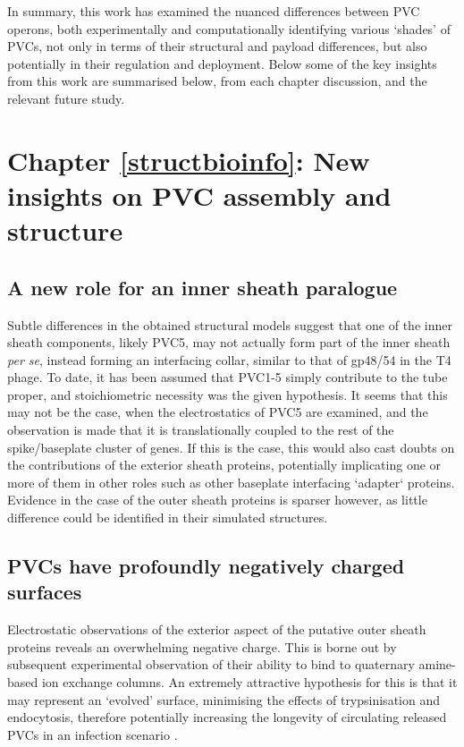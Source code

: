 In summary, this work has examined the nuanced differences between PVC operons, both experimentally and computationally identifying various `shades' of PVCs, not only in terms of their structural and payload differences, but also potentially in their regulation and deployment. Below some of the key insights from this work are summarised below, from each chapter discussion, and the relevant future study.

\section{Chapter \ref{structbioinfo}: New insights on PVC assembly and structure}
\subsection{A new role for an inner sheath paralogue}
Subtle differences in the obtained structural models suggest that one of the inner sheath components, likely PVC5, may not actually form part of the inner sheath \emph{per se}, instead forming an interfacing collar, similar to that of gp48/54 in the T4 phage. To date, it has been assumed that PVC1-5 simply contribute to the tube proper, and stoichiometric necessity was the given hypothesis. It seems that this may not be the case, when the electrostatics of PVC5 are examined, and the observation is made that it is translationally coupled to the rest of the spike/baseplate cluster of genes. If this is the case, this would also cast doubts on the contributions of the exterior sheath proteins, potentially implicating one or more of them in other roles such as other baseplate interfacing `adapter` proteins. Evidence in the case of the outer sheath proteins is sparser however, as little difference could be identified in their simulated structures.

\subsection{PVCs have profoundly negatively charged surfaces}
Electrostatic observations of the exterior aspect of the putative outer sheath proteins reveals an overwhelming negative charge. This is borne out by subsequent experimental observation of their ability to bind to quaternary amine-based ion exchange columns. An extremely attractive hypothesis for this is that it may represent an `evolved' surface, minimising the effects of trypsinisation and endocytosis, therefore potentially increasing the longevity of circulating released PVCs in an infection scenario \citep{DelTordello2016, Kaur2012}.

